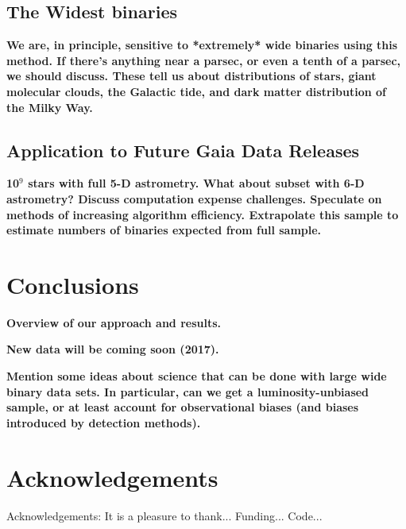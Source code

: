 \documentclass[usenatbib]{mnras}
\begin{document}
\subsection{The Widest binaries}
{\bf We are, in principle, sensitive to *extremely* wide binaries using this method. If there's anything near a parsec, or even a tenth of a parsec, we should discuss. These tell us about distributions of stars, giant molecular clouds, the Galactic tide, and dark matter distribution of the Milky Way. }


\subsection{Application to Future Gaia Data Releases}
{\bf 10$^9$ stars with full 5-D astrometry. What about subset with 6-D astrometry? Discuss computation expense challenges. Speculate on methods of increasing algorithm efficiency. Extrapolate this sample to estimate numbers of binaries expected from full sample. } 





\section{Conclusions}

{\bf Overview of our approach and results.}

{\bf New data will be coming soon (2017).}

{\bf Mention some ideas about science that can be done with large wide binary data sets. In particular, can we get a luminosity-unbiased sample, or at least account for observational biases (and biases introduced by detection methods).}


\section*{Acknowledgements}
Acknowledgements:
It is a pleasure to thank...
Funding...
Code...





\label{lastpage}
\end{document}
